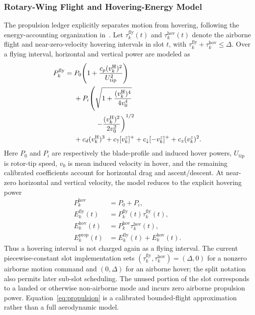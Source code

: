 \documentclass[journal]{IEEEtran}
\begin{document}
\subsubsection{Rotary-Wing Flight and Hovering-Energy Model}
The propulsion ledger explicitly separates motion from hovering, following
the energy-accounting organization in~\cite{talukdar2026bamappo}.  Let
$\tau_k^{\mathrm{fly}}(t)$ and $\tau_k^{\mathrm{hov}}(t)$ denote the
airborne flight and near-zero-velocity hovering intervals in slot $t$, with
$\tau_k^{\mathrm{fly}}+\tau_k^{\mathrm{hov}}\le\Delta$.  Over a flying
interval, horizontal and vertical power are modeled as
\begin{equation}
\begin{aligned}
P_k^{\mathrm{fly}}={}&P_0\!\left(1+
\frac{c_p(v_k^{\mathrm H})^2}{U_{\mathrm{tip}}^2}\right)\\
&+P_i\!\left(\sqrt{1+\frac{(v_k^{\mathrm H})^4}{4v_0^4}}\right.\\
&\left.\hspace{3.1em}-\frac{(v_k^{\mathrm H})^2}{2v_0^2}\right)^{1/2}\\
&+c_d(v_k^{\mathrm H})^3
+c_{\uparrow}[v_k^z]^+
+c_{\downarrow}[-v_k^z]^+
+c_z(v_k^z)^2 .
\end{aligned}
\label{eq:propulsion}
\end{equation}
Here $P_0$ and $P_i$ are respectively the blade-profile and induced
hover powers, $U_{\mathrm{tip}}$ is rotor-tip speed, $v_0$ is mean induced
velocity in hover, and the remaining calibrated coefficients account for
horizontal drag and ascent/descent.  At near-zero horizontal and vertical
velocity, the model reduces to the explicit hovering power
\begin{equation}
\begin{aligned}
P_k^{\mathrm{hov}}&=P_0+P_i,\\
E_k^{\mathrm{fly}}(t)&=P_k^{\mathrm{fly}}(t)
 \tau_k^{\mathrm{fly}}(t),\\
E_k^{\mathrm{hov}}(t)&=P_k^{\mathrm{hov}}
 \tau_k^{\mathrm{hov}}(t),\\
E_k^{\mathrm{prop}}(t)&=E_k^{\mathrm{fly}}(t)
 +E_k^{\mathrm{hov}}(t).
\end{aligned}
\label{eq:hovering}
\end{equation}
Thus a hovering interval is not charged again as a flying interval.  The
current piecewise-constant slot implementation sets
$(\tau_k^{\mathrm{fly}},\tau_k^{\mathrm{hov}})=(\Delta,0)$ for a nonzero
airborne motion command and $(0,\Delta)$ for an airborne hover; the split
notation also permits later sub-slot scheduling.  The
unused portion of the slot corresponds to a landed or otherwise non-airborne
mode and incurs zero airborne propulsion power.  Equation~\eqref{eq:propulsion}
is a calibrated bounded-flight approximation rather than a full aerodynamic
model.
\end{document}
